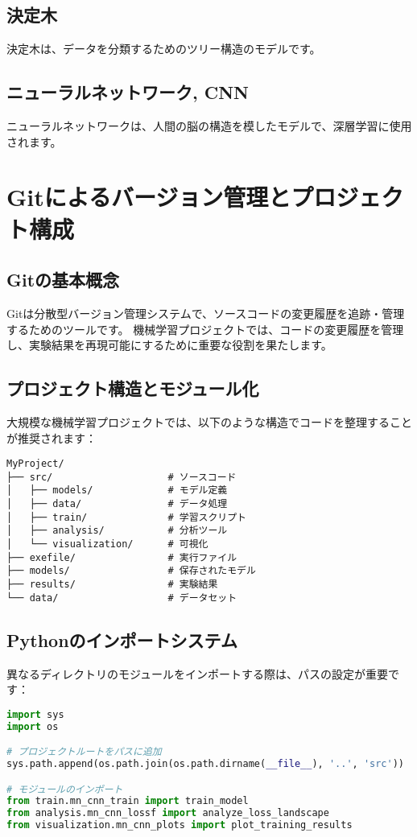 \documentclass{ltjsarticle}      %
\begin{document}
\subsection{決定木}
 決定木は、データを分類するためのツリー構造のモデルです。
\subsection{ニューラルネットワーク, CNN}
 ニューラルネットワークは、人間の脳の構造を模したモデルで、深層学習に使用されます。

\appendix
\section{Gitによるバージョン管理とプロジェクト構成}

\subsection{Gitの基本概念}
Gitは分散型バージョン管理システムで、ソースコードの変更履歴を追跡・管理するためのツールです。
機械学習プロジェクトでは、コードの変更履歴を管理し、実験結果を再現可能にするために重要な役割を果たします。

\subsection{プロジェクト構造とモジュール化}
大規模な機械学習プロジェクトでは、以下のような構造でコードを整理することが推奨されます：

\begin{verbatim}
MyProject/
├── src/                    # ソースコード
│   ├── models/             # モデル定義
│   ├── data/               # データ処理
│   ├── train/              # 学習スクリプト
│   ├── analysis/           # 分析ツール
│   └── visualization/      # 可視化
├── exefile/                # 実行ファイル
├── models/                 # 保存されたモデル
├── results/                # 実験結果
└── data/                   # データセット
\end{verbatim}

\subsection{Pythonのインポートシステム}
異なるディレクトリのモジュールをインポートする際は、パスの設定が重要です：

\begin{lstlisting}[language=Python]
import sys
import os

# プロジェクトルートをパスに追加
sys.path.append(os.path.join(os.path.dirname(__file__), '..', 'src'))

# モジュールのインポート
from train.mn_cnn_train import train_model
from analysis.mn_cnn_lossf import analyze_loss_landscape
from visualization.mn_cnn_plots import plot_training_results
\end{lstlisting}
\end{document}
